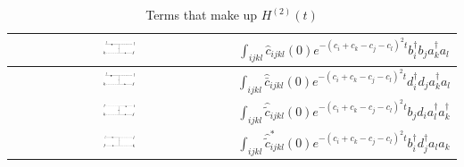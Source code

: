 \begin{table}[h]
    \centering
    \hspace*{-1.7cm} %
    \begin{tabular}{|c|c|}
        \hline
        \includegraphics[width=0.15\textwidth]{figures/f-inst.pdf} & 
        {\small $\displaystyle 
        \int_{ijkl} \hat c_{ijkl}(0) e^{-\left(c_i + c_k - c_j - c_l \right)^2t} b_i^\dagger b_j a_k^\dagger a_l
        $} \\
        \hline
        \includegraphics[width=0.15\textwidth]{figures/fbar-inst.pdf} & 
        {\small $\displaystyle 
        \int_{ijkl} \hat{\bar{c}}_{ijkl}(0) e^{-\left(c_i + c_k - c_j - c_l \right)^2t} d_i^\dagger d_j a_k^\dagger a_l
        $} \\
        \hline
        \includegraphics[width=0.15\textwidth]{figures/fb-inst.pdf} & 
        {\small $\displaystyle 
        \int_{ijkl} \hat{\tilde{c}}_{ijkl}(0) e^{-\left(c_i + c_k - c_j - c_l \right)^2t} b_j d_i a_l^\dagger a_k^\dagger
        $} \\
        \hline
        \includegraphics[width=0.15\textwidth]{figures/bf-inst.pdf} & 
        {\small $\displaystyle 
        \int_{ijkl} \hat{\tilde{c}}^*_{ijkl}(0) e^{-\left(c_i + c_k - c_j - c_l \right)^2t} b_i^\dagger d_j^\dagger a_l a_k
        $} \\
        \hline

    \end{tabular}
    \caption{Terms that make up $H^{(2)}(t)$} 
    \label{tab:H2}

\end{table}